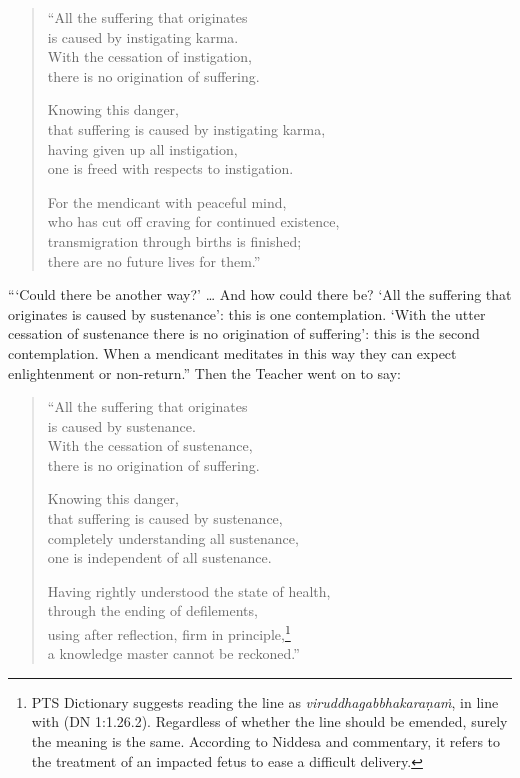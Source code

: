 \documentclass[12pt,openany]{book}%
\begin{document}
\begin{verse}%
“All the suffering that originates \\
is caused by instigating karma. \\
With the cessation of instigation, \\
there is no origination of suffering. 

Knowing this danger, \\
that suffering is caused by instigating karma, \\
having given up all instigation, \\
one is freed with respects to instigation. 

For the mendicant with peaceful mind, \\
who has cut off craving for continued existence, \\
transmigration through births is finished; \\
there are no future lives for them.” 

%
\end{verse}

“‘Could there be another way?’ … And how could there be? ‘All the suffering that originates is caused by sustenance’: this is one contemplation. ‘With the utter cessation of sustenance there is no origination of suffering’: this is the second contemplation. When a mendicant meditates in this way they can expect enlightenment or non-return.” Then the Teacher went on to say: 

\begin{verse}%
“All the suffering that originates \\
is caused by sustenance. \\
With the cessation of sustenance, \\
there is no origination of suffering. 

Knowing this danger, \\
that suffering is caused by sustenance, \\
completely understanding all sustenance, \\
one is independent of all sustenance. 

Having rightly understood the state of health, \\
through the ending of defilements, \\
using after reflection, firm in principle,\footnote{PTS Dictionary suggests reading the line as \textit{\textsanskrit{viruddhagabbhakaraṇaṁ}}, in line with (DN 1:1.26.2). Regardless of whether the line should be emended, surely the meaning is the same. According to Niddesa and commentary, it refers to the treatment of an impacted fetus to ease a difficult delivery. } \\
a knowledge master cannot be reckoned.” 

%
\end{verse}
\end{document}
